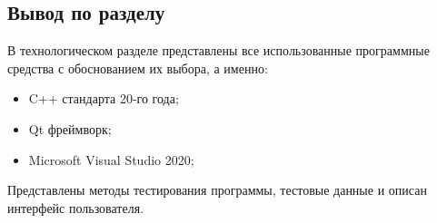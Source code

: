\subsection{Вывод по разделу}
В технологическом разделе представлены все использованные программные средства с обоснованием их выбора, а именно:
\begin{itemize}
	\item C++ стандарта 20-го года;
	\item Qt фреймворк;
	\item Microsoft Visual Studio 2020;
\end{itemize}

Представлены методы тестирования программы, тестовые данные и описан интерфейс пользователя.

